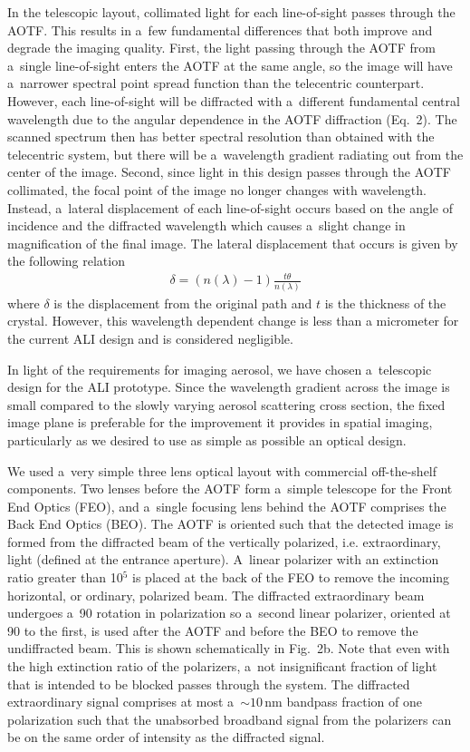 \documentclass[amtd, online, hvmath]{copernicus}
\begin{document}
In the telescopic layout, collimated light for each line-of-sight
passes through the AOTF. This results in a~few fundamental differences
that both improve and degrade the imaging quality. First, the light
passing through the AOTF from a~single line-of-sight enters the AOTF
at the same angle, so the image will have a~narrower spectral point
spread function than the telecentric counterpart. However, each
line-of-sight will be diffracted with a~different fundamental central
wavelength due to the angular dependence in the AOTF diffraction
(Eq.~2). The scanned spectrum then has better spectral resolution than
obtained with the telecentric system, but there will be a~wavelength
gradient radiating out from the center of the image.  Second, since
light in this design passes through the AOTF collimated, the focal
point of the image no longer changes with wavelength. Instead,
a~lateral displacement of each line-of-sight occurs based on the angle
of incidence and the diffracted wavelength which causes a~slight
change in magnification of the final image. The lateral displacement
that occurs is given by the following relation
\begin{align}
\delta =\left(n\left(\lambda \right)-1 \right)\frac{t\theta} {n(\lambda)}
\end{align}
where $\delta$ is the displacement from the original path and $t$ is the
thickness of the crystal. However, this wavelength
dependent change is less than a micrometer for the current ALI design and is considered negligible.

In light of the requirements for imaging aerosol, we have chosen
a~telescopic design for the ALI prototype. Since the wavelength
gradient across the image is small compared to the slowly varying
aerosol scattering cross section, the fixed image plane is preferable
for the improvement it provides in spatial imaging, particularly as we
desired to use as simple as possible an optical design.

We used a~very simple three lens optical layout with commercial
off-the-shelf components. Two lenses before the AOTF form a~simple
telescope for the Front End Optics (FEO), and a~single focusing lens
behind the AOTF comprises the Back End Optics (BEO). The AOTF is
oriented such that the detected image is formed from the diffracted
beam of the vertically polarized, i.e. extraordinary, light (defined
at the entrance aperture).  A~linear polarizer with an extinction
ratio greater than 10$^{5}$ is placed at the back of the FEO to
remove the incoming horizontal, or ordinary, polarized beam. The
diffracted extraordinary beam undergoes a~90{\degree} rotation in
polarization so a~second linear polarizer, oriented at 90{\degree} to
the first, is used after the AOTF and before the BEO to remove the
undiffracted beam. This is shown schematically in Fig.~2b. Note that
even with the high extinction ratio of the polarizers, a~not
insignificant fraction of light that is intended to be blocked passes
through the system.  The diffracted extraordinary signal comprises at
most a~$\sim 10$\,\unit{nm} bandpass fraction of one polarization such
that the unabsorbed broadband signal from the polarizers can be on the
same order of intensity as the diffracted signal.
\end{document}
